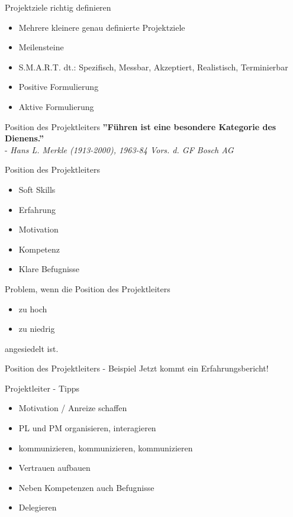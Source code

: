 \documentclass[12pt]{beamer}
\begin{document}
	\begin{frame}{Projektziele richtig definieren}
		\begin{itemize}
			\item{Mehrere kleinere genau definierte Projektziele}
			\item{Meilensteine}
			\item{S.M.A.R.T. dt.: Spezifisch, Messbar, Akzeptiert, Realistisch, Terminierbar}
			\item{Positive Formulierung}
			\item{Aktive Formulierung}
		\end{itemize}
	\end{frame}


	\begin{frame}{Position des Projektleiters}
		\textbf{''Führen ist eine besondere Kategorie des Dienens.''}\\
		 - \textit{Hans L. Merkle (1913-2000), 1963-84 Vors. d. GF Bosch AG}
	\end{frame}

	\begin{frame}{Position des Projektleiters}
		\begin{itemize}
			\item{Soft Skills}
			\item{Erfahrung}
			\item{Motivation}
			\item{Kompetenz}
			\item{Klare Befugnisse}
		\end{itemize}

		Problem, wenn die Position des Projektleiters
		\begin{itemize}
			\item{zu hoch}
			\item{zu niedrig} 
		\end{itemize}
		angesiedelt ist.
		
	\end{frame}

	\begin{frame}{Position des Projektleiters - Beispiel}
		Jetzt kommt ein Erfahrungsbericht!
	\end{frame}

	\begin{frame}{Projektleiter - Tipps}
		\begin{itemize}
			\item{Motivation / Anreize schaffen}
			\item{PL und PM organisieren, interagieren}
			\item{kommunizieren, kommunizieren, kommunizieren}
			\item{Vertrauen aufbauen}
			\item{Neben Kompetenzen auch Befugnisse}
			\item{Delegieren}
		\end{itemize}
	\end{frame}
\end{document}
